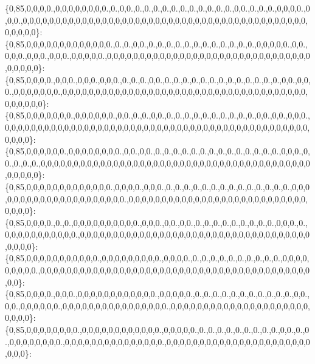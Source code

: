 \{0,85,0,0,0,0.,0,0,0,0,0,0,0,0.,0.,0,0.,0.,0.,0.,0.,0.,0.,0.,0.,0.,0.,0.,0,0.,0.,0.,0.,0,0,0,0.,0,0,0.,0,0,0,0,0,0,0,0,0,0,0,0,0,0,0,0,0,0,0,0,0,0,0,0,0,0,0,0,0,0,0,0,0,0,0,0,0,0,0,0,0,0,0,0,0,0,0,0\}\+: \{0,85,0,0,0,0,0,0,0,0,0,0,0,0,0.,0.,0.,0,0.,0.,0.,0.,0.,0.,0.,0.,0.,0.,0.,0.,0.,0,0,0,0,0.,0,0.,0,0,0.,0,0,0.,0,0,0.,0,0,0,0,0.,0,0,0,0,0,0,0,0,0,0,0,0,0,0,0,0,0,0,0,0,0,0,0,0,0,0,0,0,0,0,0,0,0,0,0,0\}\+: \{0,85,0,0,0,0.,0,0,0.,0,0,0.,0,0,0.,0.,0.,0.,0,0.,0.,0.,0.,0.,0.,0.,0.,0.,0.,0.,0.,0.,0.,0,0.,0,0,0.,0,0,0,0,0,0,0.,0,0,0,0,0,0,0,0,0,0,0,0,0,0,0,0,0,0,0,0,0,0,0,0,0,0,0,0,0,0,0,0,0,0,0,0,0,0,0,0,0,0,0\}\+: \{0,85,0,0,0,0,0,0,0.,0,0,0,0,0,0.,0,0.,0.,0.,0,0.,0.,0.,0.,0.,0.,0.,0.,0.,0.,0.,0,0.,0,0.,0,0,0.,0,0,0,0,0,0,0,0,0,0,0,0,0,0,0,0,0,0,0,0,0,0,0,0,0,0,0,0,0,0,0,0,0,0,0,0,0,0,0,0,0,0,0,0,0,0,0,0,0,0\}\+: \{0,85,0,0,0,0,0,0.,0,0,0,0,0,0,0,0.,0,0.,0,0.,0.,0.,0.,0.,0.,0.,0.,0.,0.,0.,0.,0.,0.,0.,0,0,0.,0,0.,0.,0.,0.,0,0,0,0,0,0,0,0,0,0,0,0,0,0,0,0,0,0,0,0,0,0,0,0,0,0,0,0,0,0,0,0,0,0,0,0,0,0,0,0,0,0,0,0,0,0\}\+: \{0,85,0,0,0,0,0,0,0,0,0,0,0,0,0.,0,0,0,0.,0,0,0.,0.,0.,0.,0.,0.,0.,0.,0.,0.,0.,0.,0.,0.,0.,0,0,0,0,0,0,0,0,0,0,0,0,0,0,0,0,0,0,0,0,0.,0,0,0,0,0,0,0,0,0,0,0,0,0,0,0,0,0,0,0,0,0,0,0,0,0,0,0,0,0,0,0\}\+: \{0,85,0,0,0,0.,0.,0.,0,0,0,0,0,0,0,0,0,0.,0,0,0.,0,0.,0,0.,0.,0.,0.,0.,0.,0.,0.,0.,0.,0,0,0.,0.,0,0,0,0,0,0,0,0,0,0,0.,0,0,0,0,0,0,0,0,0,0,0,0,0,0,0,0,0,0,0,0,0,0,0,0,0,0,0,0,0,0,0,0,0,0,0,0,0,0,0\}\+: \{0,85,0,0,0,0,0,0,0,0,0,0,0.,0,0,0,0,0,0,0,0,0.,0,0,0,0.,0.,0.,0.,0.,0.,0.,0.,0.,0.,0.,0,0,0,0,0,0,0,0,0.,0,0,0,0,0,0,0,0,0,0,0,0,0,0,0,0,0,0,0,0,0,0,0,0,0,0,0,0,0,0,0,0,0,0,0,0,0,0,0,0,0,0,0\}\+: \{0,85,0,0,0,0.,0,0,0.,0,0,0,0,0,0,0,0,0,0,0,0.,0,0,0,0,0.,0.,0.,0.,0.,0.,0.,0.,0.,0.,0.,0.,0,0.,0,0.,0,0,0,0,0,0.,0,0,0,0,0,0,0,0,0,0,0,0,0,0,0,0.,0,0,0,0,0,0,0,0,0,0,0,0,0,0,0,0,0,0,0,0,0,0,0,0,0\}\+: \{0,85,0,0,0,0,0,0,0,0.,0,0,0,0,0,0,0,0,0,0,0,0.,0,0,0,0,0.,0.,0.,0.,0.,0.,0.,0.,0.,0.,0,0.,0.,0.,0,0,0,0,0,0,0,0.,0,0,0,0,0,0,0,0,0,0,0,0,0,0,0.,0,0,0,0,0,0,0,0,0,0,0,0,0,0,0,0,0,0,0,0,0,0,0,0,0\}\+: 